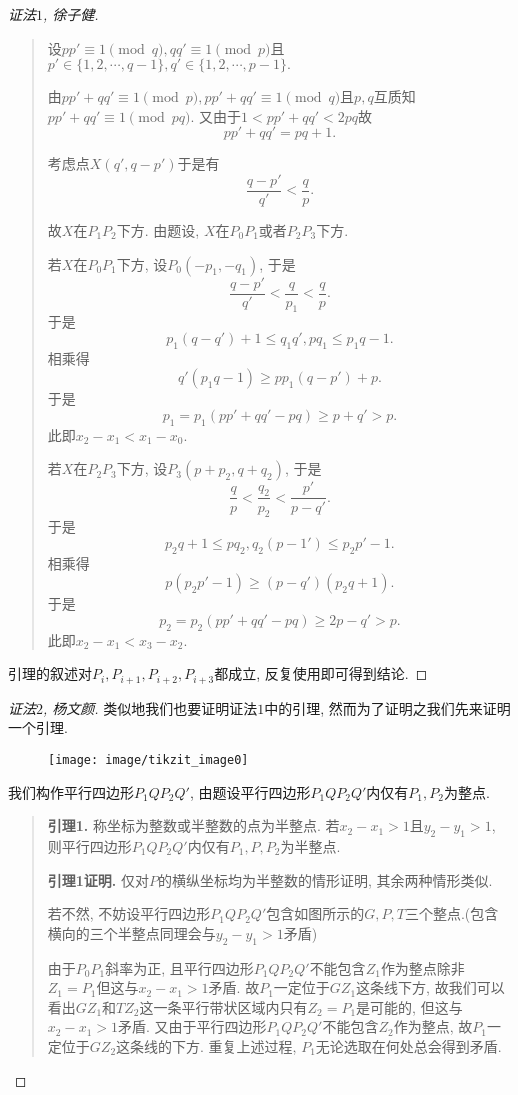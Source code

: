 \documentclass[lang=cn,12pt,a4paper]{elegantpaper.cls}
\begin{document}
\begin{enumerate}
\begin{proof}[证法$1$, 徐子健]
\begin{quote}
		设$pp'\equiv 1 \pmod{q},qq'\equiv 1 \pmod{p}$且$p' \in \{1,2,\cdots,q-1\},q' \in \{1,2,\cdots,p-1\}.$
		
		由$pp'+qq'\equiv 1 \pmod{p},pp'+qq'\equiv 1 \pmod{q}$且$p,q$互质知$pp'+qq'\equiv 1 \pmod{pq}$. 又由于$1<pp'+qq'<2pq$故
		\[pp'+qq'=pq+1.\]
		
		考虑点$X(q',q-p')$于是有
		\[\dfrac{q-p'}{q'}<\dfrac{q}{p}.\]
		
		故$X$在$P_1P_2$下方. 由题设, $X$在$P_0P_1$或者$P_2P_3$下方.
		
		若$X$在$P_0P_1$下方, 设$P_0(-p_1,-q_1)$, 于是
		\[\dfrac{q-p'}{q'}<\dfrac{q}{p_1}<\dfrac{q}{p}.\]
		于是
		\[p_1(q-q')+1\leq q_1q', pq_1\leq p_1q-1.\]
		相乘得
		\[q'(p_1q-1)\geq pp_1(q-p')+p.\]
		于是
		\[p_1=p_1(pp'+qq'-pq)\geq p+q'>p.\]
		此即$x_2-x_1<x_1-x_0$.
		
		若$X$在$P_2P_3$下方, 设$P_3(p+p_2,q+q_2)$, 于是
		\[\dfrac{q}{p}<\dfrac{q_2}{p_2}<\dfrac{p'}{p-q'}.\]
		于是
		\[p_2q+1\leq pq_2, q_2(p-1')\leq p_2p'-1.\]
		相乘得
		\[p(p_2p'-1)\geq(p-q')(p_2q+1).\]
		于是
		\[p_2=p_2(pp'+qq'-pq)\geq 2p-q'>p.\]
		此即$x_2-x_1<x_3-x_2$.
		\end{quote}
		
		引理的叙述对$P_i,P_{i+1},P_{i+2},P_{i+3}$都成立, 反复使用即可得到结论.
	\end{proof}
	\begin{proof}[证法$2$, 杨文颜]
		类似地我们也要证明证法$1$中的引理, 然而为了证明之我们先来证明一个引理.
		
		\begin{figure}[htb!]
			\begin{center}
				\texttt{[image: image/tikzit\_image0]}
			\end{center}
		\end{figure}

		我们构作平行四边形$P_1QP_2Q'$, 由题设平行四边形$P_1QP_2Q'$内仅有$P_1,P_2$为整点.
		\begin{quote}
			\textbf{引理1.} 称坐标为整数或半整数的点为半整点. 若$x_2-x_1>1$且$y_2-y_1>1$, 则平行四边形$P_1QP_2Q'$内仅有$P_1,P,P_2$为半整点.
		
			\textbf{引理1证明.} 仅对$P$的横纵坐标均为半整数的情形证明, 其余两种情形类似.
		
			若不然, 不妨设平行四边形$P_1QP_2Q'$包含如图所示的$G,P,T$三个整点.(包含横向的三个半整点同理会与$y_2-y_1>1$矛盾)
			
			由于$P_0P_1$斜率为正, 且平行四边形$P_1QP_2Q'$不能包含$Z_1$作为整点除非$Z_1=P_1$但这与$x_2-x_1>1$矛盾. 故$P_1$一定位于$GZ_1$这条线下方, 故我们可以看出$GZ_1$和$TZ_2$这一条平行带状区域内只有$Z_2=P_1$是可能的, 但这与$x_2-x_1>1$矛盾. 又由于平行四边形$P_1QP_2Q'$不能包含$Z_2$作为整点, 故$P_1$一定位于$GZ_2$这条线的下方. 重复上述过程, $P_1$无论选取在何处总会得到矛盾. 
			

\end{quote}
\end{proof}
\end{enumerate}
\end{document}
